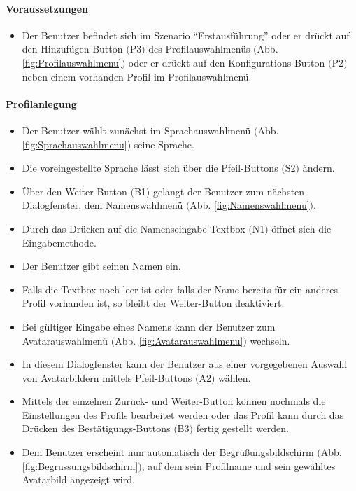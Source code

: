 \paragraph{Voraussetzungen}
\begin{itemize}
	\item Der Benutzer befindet sich im Szenario "`Erstausführung"' oder er drückt auf den Hinzufügen-Button $($P3$)$ des Profilauswahlmenüs $($Abb. \ref{fig:Profilauswahlmenu}$)$ oder er drückt auf den Konfigurations-Button $($P2$)$ neben einem vorhanden Profil im Profilauswahlmenü.
\end{itemize}
\paragraph{Profilanlegung}
\begin{itemize}
	\item Der Benutzer wählt zunächst im Sprachauswahlmenü $($Abb. \ref{fig:Sprachauswahlmenu}$)$ seine Sprache.
	\item Die voreingestellte Sprache lässt sich über die Pfeil-Buttons $($S2$)$ ändern.
	\item Über den Weiter-Button $($B1$)$ gelangt der Benutzer zum nächsten Dialogfenster, dem Namenswahlmenü $($Abb. \ref{fig:Namenswahlmenu}$)$.
	\item Durch das Drücken auf die Namenseingabe-Textbox $($N1$)$ öffnet sich die Eingabemethode.
	\item Der Benutzer gibt seinen Namen ein.
	\item Falls die Textbox noch leer ist oder falls der Name bereits für ein anderes Profil vorhanden ist, so bleibt der Weiter-Button deaktiviert.
	\item Bei gültiger Eingabe eines Namens kann der Benutzer zum Avatarauswahlmenü $($Abb. \ref{fig:Avatarauswahlmenu}$)$ wechseln.
	\item In diesem Dialogfenster kann der Benutzer aus einer vorgegebenen Auswahl von Avatarbildern mittels Pfeil-Buttons $($A2$)$ wählen.
	\item Mittels der einzelnen Zurück- und Weiter-Button können nochmals die Einstellungen des Profils bearbeitet werden oder das Profil kann durch das Drücken des Bestätigungs-Buttons $($B3$)$ fertig gestellt werden.
	\item Dem Benutzer erscheint nun automatisch der Begrüßungsbildschirm $($Abb. \ref{fig:Begrussungsbildschirm}$)$, auf dem sein Profilname und sein gewähltes Avatarbild angezeigt wird.
\end{itemize}

